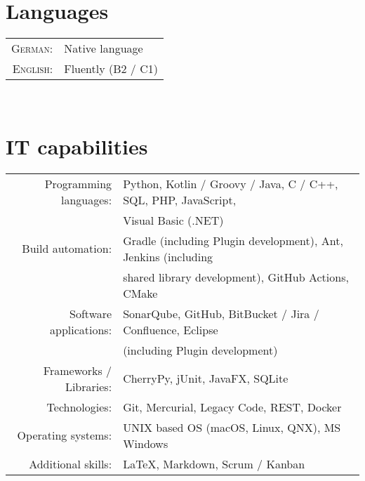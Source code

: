 \documentclass[10pt,a4paper]{article}
\begin{document}
\newpage


%
%
%
\nocite{*}
\printbibliography[title={Publications}]


\section{Languages}

\begin{tabular}{rl}
	\textsc{German:}		& Native language \\
	\textsc{English:}		& Fluently (B2 / C1) \\
\end{tabular} \\


\section{IT capabilities}

\begin{tabular}{rl}
	Programming languages:	& Python, Kotlin / Groovy / Java, C / C++, SQL, PHP, JavaScript, \\
						& Visual Basic (.NET) \\
	Build automation:		& Gradle (including Plugin development), Ant, Jenkins (including \\
						& shared library development), GitHub Actions, CMake \\
	Software applications:	& SonarQube, GitHub, BitBucket / Jira / Confluence, Eclipse \\
						& (including Plugin development) \\
	Frameworks / Libraries:	& CherryPy, jUnit, JavaFX, SQLite \\
	Technologies:			& Git, Mercurial, Legacy Code, REST,  Docker \\
	Operating systems:		& UNIX based OS (macOS, Linux, QNX), MS Windows \\
	Additional skills:		& {\fb \LaTeX}\setmainfont[SmallCapsFont=Fontin-SmallCaps.otf]{Fontin.otf}, Markdown, Scrum / Kanban \\
\end{tabular} \\
\end{document}
